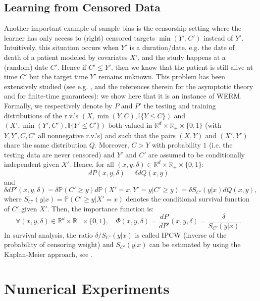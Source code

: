 \documentclass[12pt]{article}
\begin{document}
\subsection{Learning from Censored Data}
\label{subsec:censor}

Another important example of sample bias is the censorship setting where the learner has only
access to (right) censored targets $\min(Y', C')$ instead of $Y'$. Intuitively, this situation occurs when
$Y'$ is a duration/date, e.g. the date of death of a patient modeled by covariates $X'$,
and the study happens at a (random) date $C'$. Hence if $C'\le Y'$, then we know that the patient is still alive
at time $C'$ but the target time $Y'$ remains unknown.
This problem has been extensively studied (see e.g. \cite{fleming2011counting}, \cite{andersen2012statistical} and the references therein for the asymptotic theory and \cite{ausset2019empirical} for finite-time guarantees): we show here that it is an instance of WERM.
Formally, we respectively denote by $P$ and $P'$ the testing and training distributions of the r.v.'s $(X, \min(Y, C), \mathbb{I}\{Y\le C\})$ and $(X', \min(Y', C'), \mathbb{I}\{Y'\le C'\})$
both valued in $\mathbb{R}^d\times\mathbb{R}_+\times\{0, 1\}$ (with $Y, Y', C, C'$ all nonnegative r.v.'s) and such that the pairs $(X,Y)$ and $(X',Y')$ share the same distribution $Q$.
Moreover, $C>Y$ with probability $1$ (i.e. the testing data are never censored)
and $Y'$ and $C'$ are assumed to be conditionally independent given $X'$.
Hence, for all $(x,y,\delta)\in\mathbb{R}^d\times\mathbb{R}_+\times\{0, 1\}$:
$$
dP(x, y, \delta) = \delta dQ(x,y)
$$
and
$$
\delta dP'(x, y, \delta) = \delta \mathbb{P}(C'\ge y) d\mathbb{P}(X'=x, Y'=y | C'\ge y) = \delta S_{C'}(y|x) dQ(x,y),
$$
where $S_{C'}(y|x) = \mathbb{P}(C'\ge y | X'=x)$ denotes the conditional survival function of $C'$ given $X'$.
Then, the importance function is:
$$
\forall (x, y, \delta)\in\mathbb{R}^d\times\mathbb{R}_+\times\{0, 1\}, \quad \Phi(x, y, \delta) = \frac{dP}{dP'}(x, y, \delta) = \frac{\delta}{S_{C'}(y|x)}.
$$
In survival analysis, the ratio $\delta/S_{C'}(y|x)$ is called IPCW (inverse of the probability of censoring weight)
and $S_{C'}(y|x)$ can be estimated by using the Kaplan-Meier approach, see \cite{kaplan1958nonparametric}.
 
\section{Numerical Experiments}
\label{sec:num}
\end{document}
